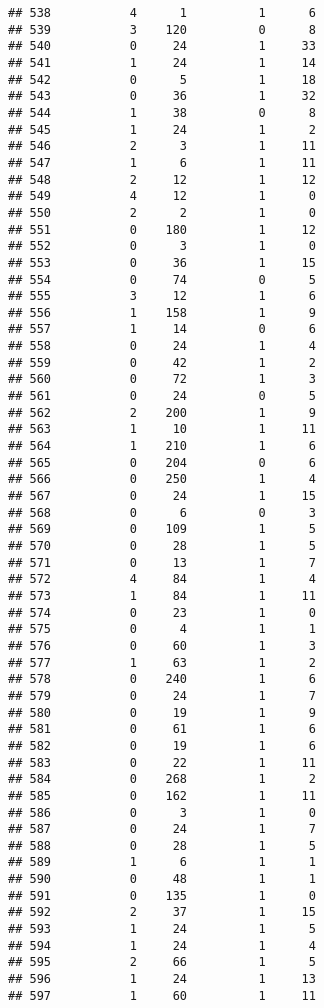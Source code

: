 \documentclass[]{article}
\begin{document}
\begin{verbatim}
## 538           4      1          1      6
## 539           3    120          0      8
## 540           0     24          1     33
## 541           1     24          1     14
## 542           0      5          1     18
## 543           0     36          1     32
## 544           1     38          0      8
## 545           1     24          1      2
## 546           2      3          1     11
## 547           1      6          1     11
## 548           2     12          1     12
## 549           4     12          1      0
## 550           2      2          1      0
## 551           0    180          1     12
## 552           0      3          1      0
## 553           0     36          1     15
## 554           0     74          0      5
## 555           3     12          1      6
## 556           1    158          1      9
## 557           1     14          0      6
## 558           0     24          1      4
## 559           0     42          1      2
## 560           0     72          1      3
## 561           0     24          0      5
## 562           2    200          1      9
## 563           1     10          1     11
## 564           1    210          1      6
## 565           0    204          0      6
## 566           0    250          1      4
## 567           0     24          1     15
## 568           0      6          0      3
## 569           0    109          1      5
## 570           0     28          1      5
## 571           0     13          1      7
## 572           4     84          1      4
## 573           1     84          1     11
## 574           0     23          1      0
## 575           0      4          1      1
## 576           0     60          1      3
## 577           1     63          1      2
## 578           0    240          1      6
## 579           0     24          1      7
## 580           0     19          1      9
## 581           0     61          1      6
## 582           0     19          1      6
## 583           0     22          1     11
## 584           0    268          1      2
## 585           0    162          1     11
## 586           0      3          1      0
## 587           0     24          1      7
## 588           0     28          1      5
## 589           1      6          1      1
## 590           0     48          1      1
## 591           0    135          1      0
## 592           2     37          1     15
## 593           1     24          1      5
## 594           1     24          1      4
## 595           2     66          1      5
## 596           1     24          1     13
## 597           1     60          1     11

\end{verbatim}
\end{document}
